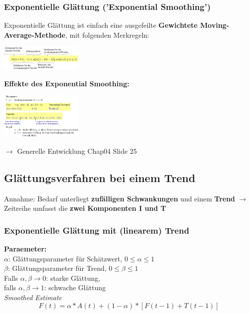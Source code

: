 \documentclass{report}
\newenvironment{Figure}
	{\par\medskip\noindent\minipage{\linewidth}}
	{\endminipage\par\medskip}
\theoremstyle{definition}
\theoremstyle{example}
\begin{document}
      \subsubsection{Exponentielle Glättung ('Exponential Smoothing')}
   Exponentielle Glättung ist einfach eine ausgefeilte \textbf{Gewichtete Moving-Average-Methode}, mit folgenden Merkregeln:

\begin{Figure}
\centering
\includegraphics[width=150px]{img/ExponentialSmoothing.png}
	\label{fig:Merkregeln des Exponential Smoothing}
\end{Figure}

\textbf{Effekte des Exponential Smoothing:}\\
\begin{Figure}
\centering
\includegraphics[width=150px]{img/EffektExponentialSmoothing.png}
	\label{fig:Effekt des Exponential Smoothing}
\end{Figure}

$\rightarrow$ Generelle Entwicklung Chap04 Slide 25

   \subsection{Glättungsverfahren bei einem Trend}
Annahme: Bedarf unterliegt \textbf{zufälligen Schwankungen} und einem \textbf{Trend} $\rightarrow$ Zeitreihe umfasst die \textbf{zwei Komponenten I und T}

      \subsubsection{Exponentielle Glättung mit (linearem) Trend}
\textbf{Paraemeter:}\\
$\alpha$: Glättungsparameter für Schätzwert, $0 \leq \alpha \leq 1$\\
$\beta$: Glättungsparameter für Trend, $0 \leq \beta \leq 1$\\
Falls $\alpha, \beta \rightarrow 0$: starke Glättung,\\
falls $\alpha, \beta \rightarrow 1$: schwache Glättung\\
   \textit{Smoothed Estimate}
\begin{equation}
   F(t) = \alpha * A(t) + (1-\alpha)*[F(t-1) + T(t-1)]
\end{equation} 
\end{document}
